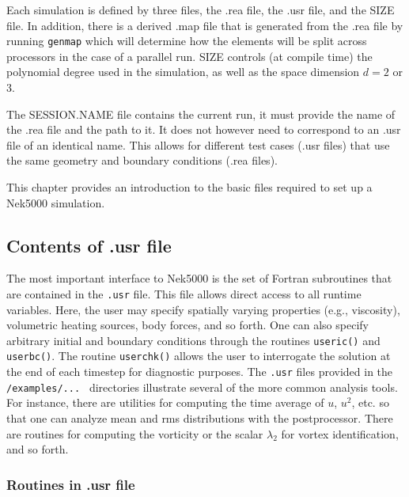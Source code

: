 

Each simulation is defined by three files, the .rea file, the .usr file,
and the SIZE file.  In addition, there is a derived .map file that is
generated from the .rea file by running {\tt genmap} which will determine how the elements will be split across processors in the case of a parallel run.
SIZE controls (at compile time) the polynomial degree used in the simulation,
as well as the space dimension \(d=2\) or 3.

The SESSION.NAME file contains the current run, it must provide the name of the .rea file and the path to it.  It does not however need to correspond to an .usr file of an identical name. This allows for different test cases (.usr files) that use the same geometry and boundary conditions (.rea files).

This chapter provides an introduction to the basic files required
to set up a Nek5000 simulation.

\subsection{Contents of .usr file}

The most important interface to Nek5000 is the
set of Fortran subroutines that are contained in the {\tt .usr} file.
This file allows direct access to all runtime variables.
Here, the user may specify spatially varying properties
(e.g., viscosity), volumetric heating sources, body forces, and so forth.
One can also specify arbitrary initial and boundary conditions through
the routines {\tt useric()} and {\tt userbc()}.
The routine {\tt userchk()} allows the user to interrogate the solution
at the end of each timestep for diagnostic purposes.   The {\tt .usr}
files provided in the {\tt /examples/... } directories illustrate
several of the more common analysis tools.  For instance, there are utilities
for computing the time average of \(u\), \(u^2\), etc. so that one can
analyze mean and rms distributions with the postprocessor.  There are
routines for computing the vorticity or the scalar \(\lambda_2\) 
for vortex identification, and so forth.


\subsubsection*{Routines in .usr file}

